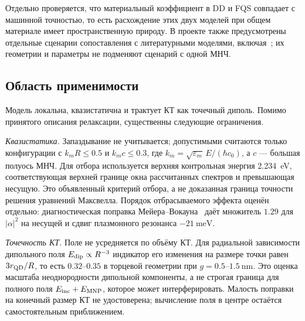 Отдельно проверяется, что материальный коэффициент в DD и FQS совпадает с
машинной точностью, то есть расхождение этих двух моделей при общем
материале имеет пространственную природу. В проекте также предусмотрены отдельные сценарии
сопоставления с литературными моделями, включая~\cite{shah2013}; их геометрии
и параметры не подменяют сценарий с одной МНЧ.

\subsection{Область применимости}
\label{sec:applicability}

Модель локальна, квазистатична и трактует КТ как точечный диполь.
Помимо принятого описания релаксации, существенны следующие ограничения.

\emph{Квазистатика.} Запаздывание не учитывается; допустимыми считаются только
конфигурации с $k_m R \le 0.5$ и $k_mc\le0.3$, где
$k_m=\sqrt{\varepsilon_m}\,E/(\hbar c_0)$, а $c$ --- большая полуось МНЧ.
Для отбора используется верхняя контрольная энергия
\SI{2.234}{\electronvolt}, соответствующая верхней границе окна
рассчитанных спектров и превышающая несущую.
Это объявленный критерий отбора, а не доказанная граница точности
решения уравнений Максвелла.
Порядок отбрасываемого эффекта оценён отдельно: диагностическая поправка
Мейера--Вокауна~\cite{meier1983} даёт
множитель $1.29$ для $|\alpha|^2$ на несущей и сдвиг плазмонного резонанса
$-\SI{21}{\milli\electronvolt}$.

\emph{Точечность КТ.} Поле не усредняется по объёму КТ. Для радиальной
зависимости дипольного поля $E_{\rm dip}\propto R^{-3}$ индикатор его
изменения на размере точки равен $3r_{\rm QD}/R$, то есть $0.32$--$0.35$
в торцевой геометрии при $g=0.5$--$\SI{1.5}{\nano\meter}$.
Это оценка масштаба неоднородности дипольной компоненты, а не строгая
граница для полного поля $E_{\rm inc}+E_{\rm MNP}$, которое может
интерферировать. Малость поправки на конечный размер КТ не удостоверена;
вычисление поля в центре остаётся самостоятельным приближением.

